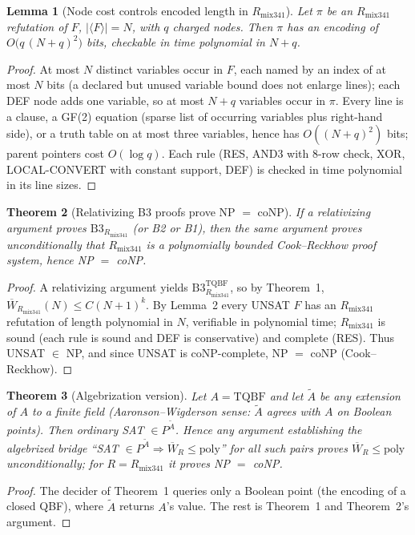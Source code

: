 \documentclass[11pt]{article}
\newtheorem{theorem}{Theorem}
\newtheorem{lemma}[theorem]{Lemma}
\newcommand{\Wb}{\overline W}
\newcommand{\TQBF}{\mathrm{TQBF}}
\newcommand{\Rmix}{R_{\mathrm{mix341}}}
\begin{document}
\begin{lemma}[Node cost controls encoded length in $\Rmix$]
Let $\pi$ be an $\Rmix$ refutation of $F$, $|\langle F\rangle|=N$, with $q$ charged nodes.
Then $\pi$ has an encoding of $O\bigl(q\,(N+q)^2\bigr)$ bits, checkable in time
polynomial in $N+q$.
\end{lemma}
\begin{proof}
At most $N$ distinct variables occur in $F$, each named by an index of at most $N$ bits
(a declared but unused variable bound does not enlarge lines); each DEF node adds one
variable, so at most $N+q$ variables occur in $\pi$. Every line is a clause, a GF(2)
equation (sparse list of occurring variables plus right-hand side), or a truth table on at
most three variables, hence has $O((N+q)^2)$ bits; parent pointers
cost $O(\log q)$. Each rule (RES, AND3 with 8-row check, XOR, LOCAL-CONVERT with constant
support, DEF) is checked in time polynomial in its line sizes.
\end{proof}

\begin{theorem}[Relativizing B3 proofs prove NP $=$ coNP]
If a relativizing argument proves $\mathrm{B3}_{\Rmix}$ (or B2 or B1), then the same
argument proves unconditionally that $\Rmix$ is a polynomially bounded Cook--Reckhow
proof system, hence NP $=$ coNP.
\end{theorem}
\begin{proof}
A relativizing argument yields $\mathrm{B3}^{\TQBF}_{\Rmix}$, so by Theorem~1,
$\Wb_{\Rmix}(N)\le C(N+1)^k$. By Lemma~2 every UNSAT $F$ has an $\Rmix$ refutation of
length polynomial in $N$, verifiable in polynomial time; $\Rmix$ is sound (each rule is
sound and DEF is conservative) and complete (RES). Thus UNSAT $\in$ NP, and since UNSAT is
coNP-complete, NP $=$ coNP (Cook--Reckhow).
\end{proof}

\begin{theorem}[Algebrization version]
Let $A=\TQBF$ and let $\tilde A$ be any extension of $A$ to a finite field
(Aaronson--Wigderson sense: $\tilde A$ agrees with $A$ on Boolean points). Then
ordinary SAT $\in P^{\tilde A}$. Hence any argument establishing the algebrized bridge
``SAT $\in P^{\tilde A}\Rightarrow \Wb_R\le\mathrm{poly}$'' for all such pairs proves
$\Wb_R\le\mathrm{poly}$ unconditionally; for $R=\Rmix$ it proves NP $=$ coNP.
\end{theorem}
\begin{proof}
The decider of Theorem~1 queries only a Boolean point (the encoding of a closed QBF), where
$\tilde A$ returns $A$'s value. The rest is Theorem~1 and Theorem~2's argument.
\end{proof}
\end{document}
